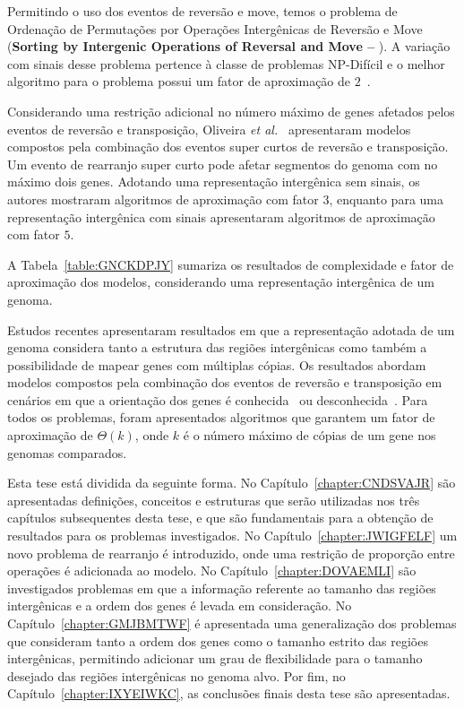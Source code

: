Permitindo o uso dos eventos de reversão e move, temos o problema de Ordenação de Permutações por Operações Intergênicas de Reversão e Move (\textbf{Sorting by Intergenic Operations of Reversal and Move --} \SbIRM). A variação com sinais desse problema pertence à classe de problemas NP-Difícil e o melhor algoritmo para o problema possui um fator de aproximação de $2$~\cite{2022b-brito-etal}.

Considerando uma restrição adicional no número máximo de genes afetados pelos eventos de reversão e transposição, Oliveira \textit{et al.}~\cite{2019c-oliveira-etal} apresentaram modelos compostos pela combinação dos eventos super curtos de reversão e transposição. Um evento de rearranjo super curto pode afetar segmentos do genoma com no máximo dois genes. Adotando uma representação intergênica sem sinais, os autores mostraram algoritmos de aproximação com fator $3$, enquanto para uma representação intergênica com sinais apresentaram algoritmos de aproximação com fator $5$.

A Tabela~\ref{table:GNCKDPJY} sumariza os resultados de complexidade e fator de aproximação dos modelos, considerando uma representação intergênica de um genoma.



Estudos recentes apresentaram resultados em que a representação adotada de um genoma considera tanto a estrutura das regiões intergênicas como também a possibilidade de mapear genes com múltiplas cópias. Os resultados abordam modelos compostos pela combinação dos eventos de reversão e transposição em cenários em que a orientação dos genes é conhecida~\cite{2022-siqueira-etal} ou desconhecida~\cite{2021b-siqueira-etal}. Para todos os problemas, foram apresentados algoritmos que garantem um fator de aproximação de $\Theta(k)$, onde $k$ é o número máximo de cópias de um gene nos genomas comparados.

Esta tese está dividida da seguinte forma. No Capítulo~\ref{chapter:CNDSVAJR} são apresentadas definições, conceitos e estruturas que serão utilizadas nos três capítulos subsequentes desta tese, e que são fundamentais para a obtenção de resultados para os problemas investigados. No Capítulo~\ref{chapter:JWIGFELF} um novo problema de rearranjo é introduzido, onde uma restrição de proporção entre operações é adicionada ao modelo. No Capítulo~\ref{chapter:DOVAEMLI} são investigados problemas em que a informação referente ao tamanho das regiões intergênicas e a ordem dos genes é levada em consideração. No Capítulo~\ref{chapter:GMJBMTWF} é apresentada uma generalização dos problemas que consideram tanto a ordem dos genes como o tamanho estrito das regiões intergênicas, permitindo adicionar um grau de flexibilidade para o tamanho desejado das regiões intergênicas no genoma alvo. Por fim, no Capítulo~\ref{chapter:IXYEIWKC}, as conclusões finais desta tese são apresentadas.

